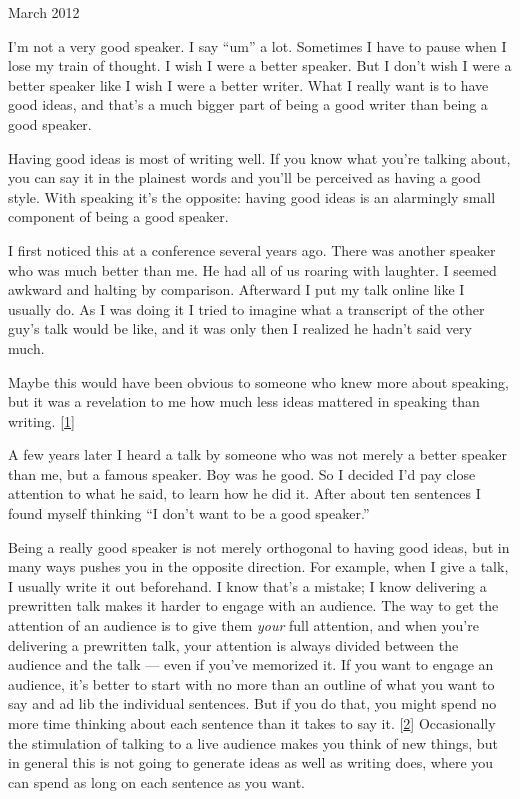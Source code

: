 March 2012

I'm not a very good speaker. I say ``um'' a lot. Sometimes I have to
pause when I lose my train of thought. I wish I were a better speaker.
But I don't wish I were a better speaker like I wish I were a better
writer. What I really want is to have good ideas, and that's a much
bigger part of being a good writer than being a good speaker.

Having good ideas is most of writing well. If you know what you're
talking about, you can say it in the plainest words and you'll be
perceived as having a good style. With speaking it's the opposite:
having good ideas is an alarmingly small component of being a good
speaker.

I first noticed this at a conference several years ago. There was
another speaker who was much better than me. He had all of us roaring
with laughter. I seemed awkward and halting by comparison. Afterward I
put my talk online like I usually do. As I was doing it I tried to
imagine what a transcript of the other guy's talk would be like, and it
was only then I realized he hadn't said very much.

Maybe this would have been obvious to someone who knew more about
speaking, but it was a revelation to me how much less ideas mattered in
speaking than writing. {[}\hyperref[f1n]{1}{]}

A few years later I heard a talk by someone who was not merely a better
speaker than me, but a famous speaker. Boy was he good. So I decided I'd
pay close attention to what he said, to learn how he did it. After about
ten sentences I found myself thinking ``I don't want to be a good
speaker.''

Being a really good speaker is not merely orthogonal to having good
ideas, but in many ways pushes you in the opposite direction. For
example, when I give a talk, I usually write it out beforehand. I know
that's a mistake; I know delivering a prewritten talk makes it harder to
engage with an audience. The way to get the attention of an audience is
to give them \emph{your} full attention, and when you're delivering a
prewritten talk, your attention is always divided between the audience
and the talk --- even if you've memorized it. If you want to engage an
audience, it's better to start with no more than an outline of what you
want to say and ad lib the individual sentences. But if you do that, you
might spend no more time thinking about each sentence than it takes to
say it. {[}\hyperref[f2n]{2}{]} Occasionally the stimulation of talking
to a live audience makes you think of new things, but in general this is
not going to generate ideas as well as writing does, where you can spend
as long on each sentence as you want.

